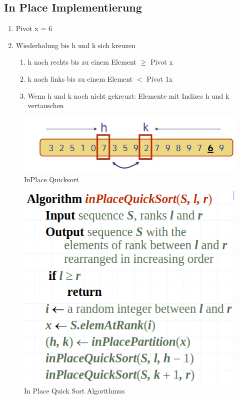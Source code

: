 \subsection{In Place Implementierung}
\begin{enumerate}
	\item Pivot x = 6
	\item Wiederholung bis h und k sich kreuzen
	\begin{enumerate}
		\item h nach rechts bis zu einem Element $\geq$ Pivot x
		\item k nach links bis zu einem Element $<$ Pivot 1x
		\item Wenn h und k noch nicht gekreuzt: Elemente mit Indizes h und k vertauschen
	\end{enumerate}
\end{enumerate}
\begin{figure}[h]
\centering
\includegraphics[width=0.35\linewidth]{images/quicksort_inplace}
\caption{InPlace Quicksort}
\label{fig:quicksortinplace}
\end{figure}

\begin{figure}[h!]
	\centering
	\begin{minipage}[t]{0.6\textwidth}
		\centering
		\includegraphics[width=0.7\linewidth]{images/inplacequicksort}
		\caption{In Place Quick Sort Algorithmus}
		\label{fig:quicksortalg}
	\end{minipage}
\end{figure}

